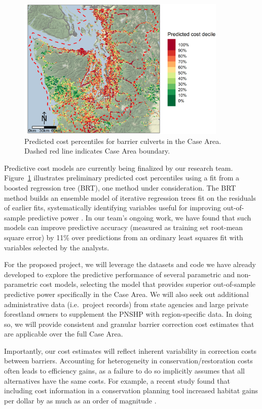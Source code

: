 \begin{figure}
	\centering
	\includegraphics[width=10cm]{figures/predCost.png}
	\caption{Predicted cost percentiles for barrier culverts in the Case Area. Dashed red line indicates Case Area boundary.\label{fig:cost}}
\end{figure}%


Predictive cost models are currently being finalized by our research team. Figure~\ref{fig:cost} illustrates preliminary predicted cost percentiles using a fit from a boosted regression tree (BRT), one method under consideration. The BRT method builds an ensemble model of iterative regression trees fit on the residuals of earlier fits, systematically identifying variables useful for improving out-of-sample predictive power \citep{elith_working_2008}. In our team's ongoing work, we have found that such models can improve predictive accuracy (measured as training set root-mean square error) by 11\% over predictions from an ordinary least squares fit with variables selected by the analysts. 

For the proposed project, we will leverage the datasets and code we have already developed to explore the predictive performance of several parametric and non-parametric cost models, selecting the model that provides superior out-of-sample predictive power specifically in the Case Area. We will also seek out additional administrative data (i.e.\ project records) from state agencies and large private forestland owners to supplement the PNSHP with region-specific data. In doing so, we will provide consistent and granular barrier correction cost estimates that are applicable over the full Case Area. 

Importantly, our cost estimates will reflect inherent variability in correction costs between barriers. Accounting for heterogeneity in conservation/restoration costs often leads to efficiency gains, as a failure to do so implicitly assumes that all alternatives have the same costs. For example, a recent study found that including cost information in a conservation planning tool increased habitat gains per dollar by as much as an order of magnitude \citep{field_quantifying_2019}. 

